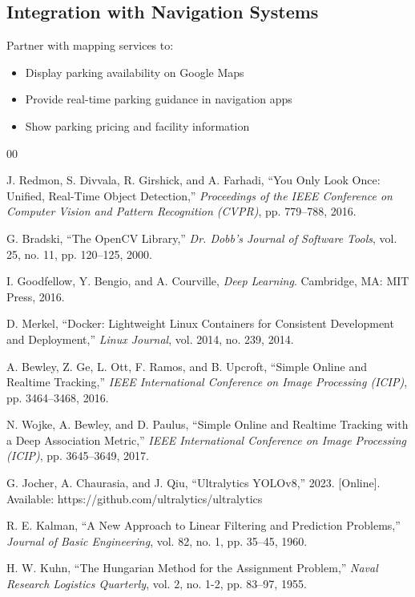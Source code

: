 \documentclass[12pt,a4paper]{report}
\begin{document}
\subsection{Integration with Navigation Systems}
Partner with mapping services to:
\begin{itemize}
    \item Display parking availability on Google Maps
    \item Provide real-time parking guidance in navigation apps
    \item Show parking pricing and facility information
\end{itemize}


\begin{thebibliography}{00}

 J. Redmon, S. Divvala, R. Girshick, and A. Farhadi, ``You Only Look Once: Unified, Real-Time Object Detection,'' \textit{Proceedings of the IEEE Conference on Computer Vision and Pattern Recognition (CVPR)}, pp. 779--788, 2016.

 G. Bradski, ``The OpenCV Library,'' \textit{Dr. Dobb's Journal of Software Tools}, vol. 25, no. 11, pp. 120--125, 2000.

 I. Goodfellow, Y. Bengio, and A. Courville, \textit{Deep Learning}. Cambridge, MA: MIT Press, 2016.

 D. Merkel, ``Docker: Lightweight Linux Containers for Consistent Development and Deployment,'' \textit{Linux Journal}, vol. 2014, no. 239, 2014.

 A. Bewley, Z. Ge, L. Ott, F. Ramos, and B. Upcroft, ``Simple Online and Realtime Tracking,'' \textit{IEEE International Conference on Image Processing (ICIP)}, pp. 3464--3468, 2016.

 N. Wojke, A. Bewley, and D. Paulus, ``Simple Online and Realtime Tracking with a Deep Association Metric,'' \textit{IEEE International Conference on Image Processing (ICIP)}, pp. 3645--3649, 2017.

 G. Jocher, A. Chaurasia, and J. Qiu, ``Ultralytics YOLOv8,'' 2023. [Online]. Available: https://github.com/ultralytics/ultralytics

 R. E. Kalman, ``A New Approach to Linear Filtering and Prediction Problems,'' \textit{Journal of Basic Engineering}, vol. 82, no. 1, pp. 35--45, 1960.

 H. W. Kuhn, ``The Hungarian Method for the Assignment Problem,'' \textit{Naval Research Logistics Quarterly}, vol. 2, no. 1-2, pp. 83--97, 1955.


\end{thebibliography}
\end{document}
